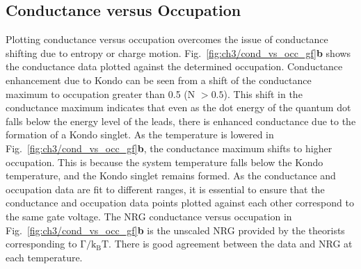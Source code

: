\subsection{Conductance versus Occupation}
Plotting conductance versus occupation overcomes the issue of conductance shifting due to entropy or charge motion. Fig.~\ref{fig:ch3/cond_vs_occ_gf}\textbf{b} shows the conductance data plotted against the determined occupation.  Conductance enhancement due to Kondo can be seen from a shift of the conductance maximum to occupation greater than 0.5 (N $>0.5$). This shift in the conductance maximum indicates that even as the dot energy of the quantum dot falls below the energy level of the leads, there is enhanced conductance due to the formation of a Kondo singlet. As the temperature is lowered in Fig.~\ref{fig:ch3/cond_vs_occ_gf}\textbf{b}, the conductance maximum shifts to higher occupation. This is because the system temperature falls below the Kondo temperature, and the Kondo singlet remains formed. As the conductance and occupation data are fit to different ranges, it is essential to ensure that the conductance and occupation data points plotted against each other correspond to the same gate voltage. The NRG conductance versus occupation in Fig.~\ref{fig:ch3/cond_vs_occ_gf}\textbf{b} is the unscaled NRG provided by the theorists corresponding to $\mathrm{\Gamma/k_BT}$. There is good agreement between the data and NRG at each temperature. 

